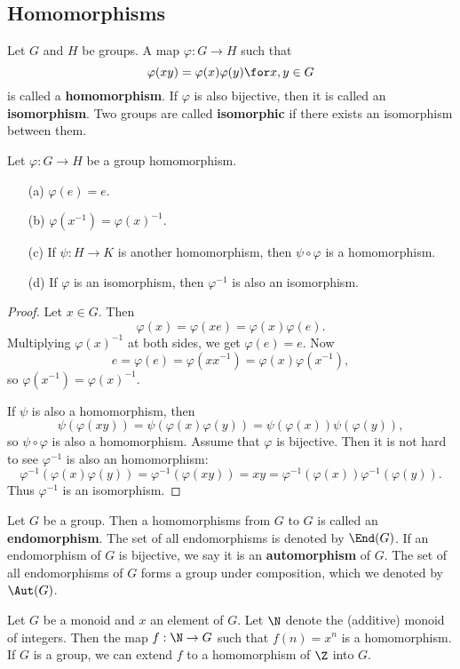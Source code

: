 \subsection{Homomorphisms}
\begin{definition}
Let $G$ and $H$ be groups. A map $\varphi:G\to H$ such that
\[\varphi(xy)=\varphi(x)\varphi(y)\for x,y\in G\]
is called a \textbf{homomorphism}. If $\varphi$ is also bijective, then it is called an \textbf{isomorphism}. Two groups are called \textbf{isomorphic} if there exists an isomorphism between them.
\end{definition}
\begin{proposition}
Let $\varphi:G\to H$ be a group homomorphism.
\begin{itemize}
\item[(a)] $\varphi(e)=e$.
\item[(b)] $\varphi(x^{-1})=\varphi(x)^{-1}$.
\item[(c)] If $\psi:H\to K$ is another homomorphism, then $\psi\circ\varphi$ is a homomorphism.
\item[(d)] If $\varphi$ is an isomorphism, then $\varphi^{-1}$ is also an isomorphism.
\end{itemize}
\end{proposition}
\begin{proof}
Let $x\in G$. Then
\[\varphi(x)=\varphi(xe)=\varphi(x)\varphi(e).\]
Multiplying $\varphi(x)^{-1}$ at both sides, we get $\varphi(e)=e$. Now
\[e=\varphi(e)=\varphi(xx^{-1})=\varphi(x)\varphi(x^{-1}),\]
so $\varphi(x^{-1})=\varphi(x)^{-1}$.\par
If $\psi$ is also a homomorphism, then
\[\psi(\varphi(xy))=\psi(\varphi(x)\varphi(y))=\psi(\varphi(x))\psi(\varphi(y)),\]
so $\psi\circ\varphi$ is also a homomorphism. Assume that $\varphi$ is bijective. Then it is not hard to see $\varphi^{-1}$ is also an homomorphism:
\[\varphi^{-1}(\varphi(x)\varphi(y))=\varphi^{-1}(\varphi(xy))=xy=\varphi^{-1}(\varphi(x))\varphi^{-1}(\varphi(y)).\]
Thus $\varphi^{-1}$ is an isomorphism.
\end{proof}
\begin{example}
Let $G$ be a group. Then a homomorphisms from $G$ to $G$ is called an \textbf{endomorphism}. The set of all endomorphisms is denoted by $\End(G)$. If an endomorphism of $G$ is bijective, we say it is an \textbf{automorphism} of $G$. The set of all endomorphisms of $G$ forms a group under composition, which we denoted by $\Aut(G)$.
\end{example}
\begin{example}
Let $G$ be a monoid and $x$ an element of $G$. Let $\N$ denote the (additive) monoid of integers. Then the map $f:\N\to G$ such that $f(n)=x^n$ is a homomorphism. If $G$ is a group, we can extend $f$ to a homomorphism of $\Z$ into $G$.
\end{example}
